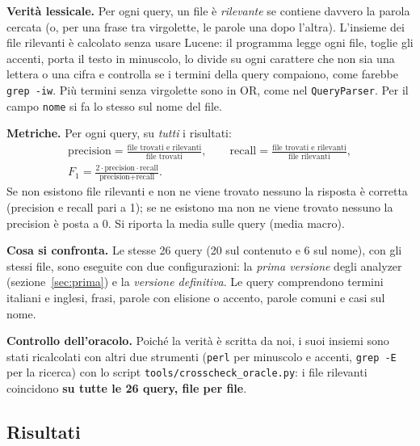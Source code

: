 \documentclass[11pt,a4paper]{article}
\newcommand{\code}[1]{\texttt{#1}}
\newcommand{\field}[1]{\texttt{#1}}
\begin{document}
\textbf{Verità lessicale.} Per ogni query, un file è \emph{rilevante} se contiene
davvero la parola cercata (o, per una frase tra virgolette, le parole una dopo
l'altra). L'insieme dei file rilevanti è calcolato senza usare Lucene: il programma
legge ogni file, toglie gli accenti, porta il testo in minuscolo, lo divide su ogni
carattere che non sia una lettera o una cifra e controlla se i termini della query
compaiono, come farebbe \code{grep -iw}. Più termini senza virgolette sono in OR, come
nel \code{QueryParser}. Per il campo \field{nome} si fa lo stesso sul nome del file.

\textbf{Metriche.} Per ogni query, su \emph{tutti} i risultati:
\begin{gather*}
\text{precision}=\frac{\text{file trovati e rilevanti}}{\text{file trovati}},\qquad
\text{recall}=\frac{\text{file trovati e rilevanti}}{\text{file rilevanti}},\\[2pt]
F_1=\frac{2\cdot\text{precision}\cdot\text{recall}}{\text{precision}+\text{recall}}.
\end{gather*}
Se non esistono file rilevanti e non ne viene trovato nessuno la risposta è corretta
(precision e recall pari a 1); se ne esistono ma non ne viene trovato nessuno la
precision è posta a 0. Si riporta la media sulle query (media macro).

\textbf{Cosa si confronta.} Le stesse 26 query (20 sul contenuto e 6 sul nome),
con gli stessi file, sono eseguite con due configurazioni: la \emph{prima versione}
degli analyzer (sezione~\ref{sec:prima}) e la \emph{versione definitiva}. Le query
comprendono termini italiani e inglesi, frasi, parole con elisione o accento, parole
comuni e casi sul nome.

\textbf{Controllo dell'oracolo.} Poiché la verità è scritta da noi, i suoi insiemi
sono stati ricalcolati con altri due strumenti (\code{perl} per minuscolo e accenti,
\code{grep -E} per la ricerca) con lo script \code{tools/crosscheck\_oracle.py}: i
file rilevanti coincidono \textbf{su tutte le 26 query, file per file}.

\subsection{Risultati}
\end{document}
